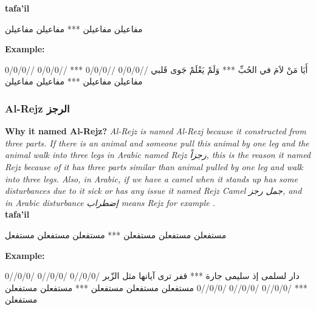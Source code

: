 \textbf{tafa'il}

\begin{Arabic}
	\begin{traditionalpoem*}
مفاعيلن مفاعيلن *** مفاعيلن مفاعيلن


	\end{traditionalpoem*}
      \end{Arabic}


\textbf{Example:}

\begin{Arabic}
	\begin{traditionalpoem*}
          أَيَا مَنْ لاَمَ في الحُبِّ *** وَلَمْ يَعْلَمْ جَوى قَلبي
          //0/0/0 //0/0/0 *** //0/0/0 //0/0/0
          مفاعيلن مفاعيلن *** مفاعيلن مفاعيلن




	\end{traditionalpoem*}
      \end{Arabic}



\subsubsection{Al-Rejz \textarabic{الرجز}}
\textbf{Why it named Al-Rejz?}
\textit{Al-Rejz is named Al-Rezj because it constructed from three parts. If there is an animal and someone pull this animal by one leg and the animal walk into three legs in Arabic named Rejz \textarabic{رجزاً}, this is the reason it named Rejz because of it has three parts similar than animal pulled by one leg and walk into three legs. Also, in Arabic, if we have a camel when it stands up has some disturbances due to it sick or has any issue it named Rejz Camel \textarabic{جمل رجز}, and in Arabic disturbance \textarabic{إضطراب} means Rejz for example \cite{Alkafi1994}.}\\


\textbf{tafa'il}

\begin{Arabic}
  \begin{traditionalpoem*}
    مستفعلن مستفعلن مستفعلن *** مستفعلن مستفعلن مستفعل


	\end{traditionalpoem*}
      \end{Arabic}


\textbf{Example:}

\begin{Arabic}
  \begin{traditionalpoem*}
    دار لسلمى إذ سليمى جارة *** قفر ترى آيانها مثل الزّبر
    /0/0//0 /0/0//0 /0/0//0 *** /0/0//0 /0/0//0 /0/0//0
مستفعلن مستفعلن مستفعلن *** مستفعلن مستفعلن مستفعلن



	\end{traditionalpoem*}
      \end{Arabic}


